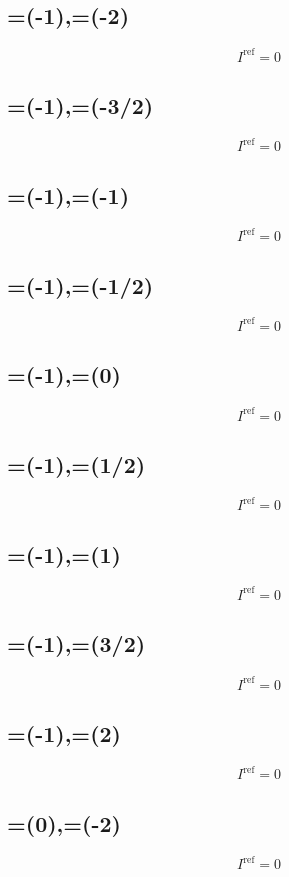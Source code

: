 \documentclass[11pt,a4paper]{article}
\newcommand{\Iref}{I^{\mathrm{ref}}}
\begin{document}
\subsection{=(-1),\;=(-2)}
\[ \Iref = 0 \]

\subsection{=(-1),\;=(-3/2)}
\[ \Iref = 0 \]

\subsection{=(-1),\;=(-1)}
\[ \Iref = 0 \]

\subsection{=(-1),\;=(-1/2)}
\[ \Iref = 0 \]

\subsection{=(-1),\;=(0)}
\[ \Iref = 0 \]

\subsection{=(-1),\;=(1/2)}
\[ \Iref = 0 \]

\subsection{=(-1),\;=(1)}
\[ \Iref = 0 \]

\subsection{=(-1),\;=(3/2)}
\[ \Iref = 0 \]

\subsection{=(-1),\;=(2)}
\[ \Iref = 0 \]

\subsection{=(0),\;=(-2)}
\[ \Iref = 0 \]
\end{document}
